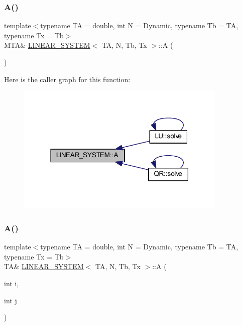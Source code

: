 \subsubsection{\texorpdfstring{A()}{A()}\hspace{0.1cm}{\footnotesize\ttfamily [1/2]}}
{\footnotesize\ttfamily template$<$typename TA = double, int N = Dynamic, typename Tb = TA, typename Tx = Tb$>$ \\
M\+TA\& \mbox{\hyperlink{class_l_i_n_e_a_r___s_y_s_t_e_m}{L\+I\+N\+E\+A\+R\+\_\+\+S\+Y\+S\+T\+EM}}$<$ TA, N, Tb, Tx $>$\+::A (\begin{DoxyParamCaption}{ }\end{DoxyParamCaption})\hspace{0.3cm}{\ttfamily [inline]}}

Here is the caller graph for this function\+:\nopagebreak
\begin{figure}[H]
\begin{center}
\leavevmode
\includegraphics[width=285pt]{class_l_i_n_e_a_r___s_y_s_t_e_m_a307c8896bb3218768f016a2a24de3bcd_icgraph}
\end{center}
\end{figure}
\mbox{\label{class_l_i_n_e_a_r___s_y_s_t_e_m_a5163aedcb567d591f5812bd3c892fb07}} 
\subsubsection{\texorpdfstring{A()}{A()}\hspace{0.1cm}{\footnotesize\ttfamily [2/2]}}
{\footnotesize\ttfamily template$<$typename TA = double, int N = Dynamic, typename Tb = TA, typename Tx = Tb$>$ \\
TA\& \mbox{\hyperlink{class_l_i_n_e_a_r___s_y_s_t_e_m}{L\+I\+N\+E\+A\+R\+\_\+\+S\+Y\+S\+T\+EM}}$<$ TA, N, Tb, Tx $>$\+::A (\begin{DoxyParamCaption}\item[{int}]{i,  }\item[{int}]{j }\end{DoxyParamCaption})\hspace{0.3cm}{\ttfamily [inline]}}

